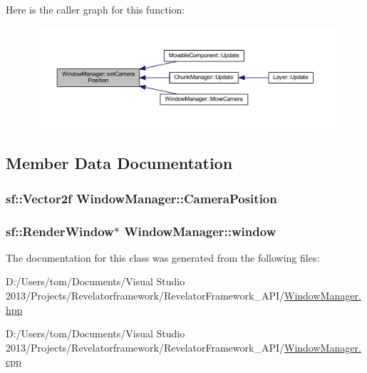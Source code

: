 Here is the caller graph for this function\-:\nopagebreak
\begin{figure}[H]
\begin{center}
\leavevmode
\includegraphics[width=350pt]{class_window_manager_a5ee838ab6472ae7fcfd607831a8228d1_icgraph}
\end{center}
\end{figure}




\subsection{Member Data Documentation}
\hypertarget{class_window_manager_a459ad4d059f5c4f286c24af4550c6101}{
\subsubsection[{Camera\-Position}]{\setlength{\rightskip}{0pt plus 5cm}sf\-::\-Vector2f Window\-Manager\-::\-Camera\-Position\hspace{0.3cm}{\ttfamily [private]}}}\label{class_window_manager_a459ad4d059f5c4f286c24af4550c6101}
\hypertarget{class_window_manager_ac7ca38df4c12f4127e75939259ec108c}{
\subsubsection[{window}]{\setlength{\rightskip}{0pt plus 5cm}sf\-::\-Render\-Window$\ast$ Window\-Manager\-::window\hspace{0.3cm}{\ttfamily [private]}}}\label{class_window_manager_ac7ca38df4c12f4127e75939259ec108c}


The documentation for this class was generated from the following files\-:\begin{DoxyCompactItemize}
\item 
D\-:/\-Users/tom/\-Documents/\-Visual Studio 2013/\-Projects/\-Revelatorframework/\-Revelator\-Framework\-\_\-\-A\-P\-I/\hyperlink{_window_manager_8hpp}{Window\-Manager.\-hpp}\item 
D\-:/\-Users/tom/\-Documents/\-Visual Studio 2013/\-Projects/\-Revelatorframework/\-Revelator\-Framework\-\_\-\-A\-P\-I/\hyperlink{_window_manager_8cpp}{Window\-Manager.\-cpp}\end{DoxyCompactItemize}
